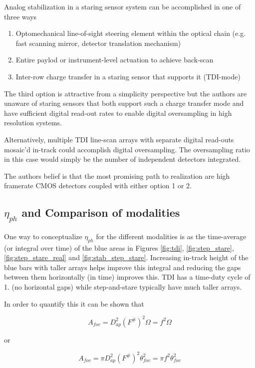\documentclass[10pt,journal]{IEEEtran}  %
\begin{document}
Analog stabilization in a staring sensor system can be accomplished in one of three ways

\begin{enumerate}
    \item Optomechanical line-of-sight steering element within the optical chain (e.g. fast scanning mirror, detector translation mechanism) \cite{patent:dirk}
    \item Entire paylod or instrument-level actuation to achieve back-scan \cite{patent:jonny}
    \item Inter-row charge transfer in a staring sensor that supports it (TDI-mode)
\end{enumerate}

The third option is attractive from a simplicity perspective but the authors are unaware of staring sensors that both support such a charge transfer mode and have sufficient digital read-out rates to enable digital oversampling in high resolution systems.

Alternatively, multiple TDI line-scan arrays with separate digital read-outs mosaic'd in-track could accomplish digital oversampling.  The oversampling ratio in this case would simply be the number of independent detectors integrated.

The authors belief is that the most promising path to realization are high framerate CMOS detectors coupled with either option 1 or 2.

\subsection{$\eta_{ph}$ and Comparison of modalities}
\label{sec:eta_ph}

One way to conceptualize $\eta_{ph}$ for the different modalities is as the time-average (or integral over time) of the blue areas in Figures \ref{fig:tdi}, \ref{fig:step_stare}, \ref{fig:step_stare_real} and \ref{fig:stab_step_stare}.  Increasing in-track height of the blue bars with taller arrays helps improve this integral and reducing the gaps between them horizontally (in time) improves this.  TDI has a time-duty cycle of 1. (no horizontal gaps) while step-and-stare typically have much taller arrays.

In order to quantify this it can be shown that

$$A_{fov} = D_{ap}^2 \left(F^\# \right)^2 \Omega = f^2 \Omega $$

or 

$$A_{fov} = \pi D_{ap}^2 \left(F^\# \right)^2 \theta_{fov}^2 = \pi f^2 \theta_{fov}^2$$
\end{document}
